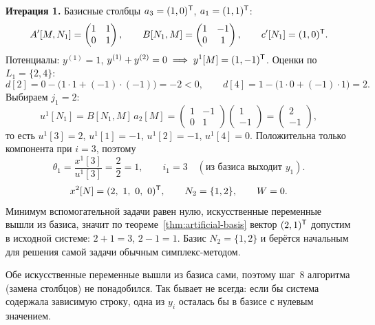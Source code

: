 \begin{example}
\medskip
\noindent\textbf{Итерация 1.} Базисные столбцы $a_3 = (1,0)^{\mathsf{T}}$, $a_1 = (1,1)^{\mathsf{T}}$:
\[
  A'[M,N_1] = \begin{pmatrix} 1 & 1 \\ 0 & 1 \end{pmatrix} ,
  \qquad
  B[N_1,M] = \begin{pmatrix} 1 & -1 \\ 0 & 1 \end{pmatrix} ,
  \qquad
  c'[N_1] = (1, 0)^{\mathsf{T}} .
\]
Потенциалы: $y^{(1)} = 1$, $y^{(1)} + y^{(2)} = 0 \implies y^1[M] = (1,-1)^{\mathsf{T}}$.
Оценки по $L_1 = \{2,4\}$:
\[
  d[2] = 0 - \big(1\cdot 1 + (-1)\cdot(-1)\big) = -2 < 0 ,
  \qquad
  d[4] = 1 - \big(1\cdot 0 + (-1)\cdot 1\big) = 2 .
\]
Выбираем $j_1 = 2$:
\[
  u^1[N_1] = B[N_1,M]\,a_2[M]
    = \begin{pmatrix} 1 & -1 \\ 0 & 1 \end{pmatrix}
      \begin{pmatrix} 1 \\ -1 \end{pmatrix}
    = \begin{pmatrix} 2 \\ -1 \end{pmatrix} ,
\]
то есть $u^1[3] = 2$, $u^1[1] = -1$, $u^1[2] = -1$, $u^1[4] = 0$. Положительна
только компонента при $i = 3$, поэтому
\[
  \theta_1 = \frac{x^1[3]}{u^1[3]} = \frac22 = 1 , \qquad i_1 = 3
  \quad (\text{из базиса выходит } y_1) .
\]
\[
  x^2[N] = (2,\ 1,\ 0,\ 0)^{\mathsf{T}} , \qquad N_2 = \{1,2\} , \qquad W = 0 .
\]
Минимум вспомогательной задачи равен нулю, искусственные переменные вышли из
базиса, значит по теореме~\ref{thm:artificial-basis} вектор $(2,1)^{\mathsf{T}}$ допустим в
исходной системе: $2 + 1 = 3$, $2 - 1 = 1$. Базис $N_2 = \{1,2\}$ и берётся
начальным для решения самой задачи обычным симплекс-методом.
\end{example}

\begin{idea}
Обе искусственные переменные вышли из базиса сами, поэтому шаг~8 алгоритма
(замена столбцов) не понадобился. Так бывает не всегда: если бы система
содержала зависимую строку, одна из $y_i$ осталась бы в базисе с нулевым
значением.
\end{idea}
